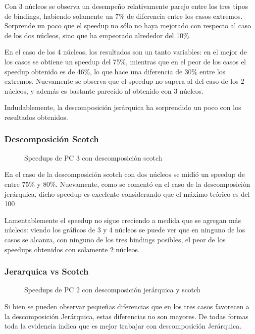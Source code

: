 \documentclass{article}
\begin{document}
Con 3 núcleos se observa un desempeño relativamente parejo entre los tres tipos de bindings, habiendo solamente un 7\% de diferencia entre los casos extremos. Sorprende un poco que el speedup no sólo no haya mejorado con respecto al caso de los dos núcleos, sino que ha empeorado alrededor del 10\%.

En el caso de los 4 núcleos, los resultados son un tanto variables: en el mejor de los casos se obtiene un speedup del 75\%, mientras que en el peor de los casos el speedup obtenido es de 46\%, lo que hace una diferencia de 30\% entre los extremos. Nuevamente se observa que el speedup no supera al del caso de los 2 núcleos, y además es bastante parecido al obtenido con 3 núcleos. 

Indudablemente, la descomposición jerárquica ha sorprendido un poco con los resultados obtenidos.

\subsubsection{Descomposición Scotch}
\begin{figure}[H]
    
    \caption{Speedups de PC 3 con descomposición scotch}
\end{figure}
En el caso de la descomposición scotch con dos núcleos se midió un speedup de entre 75\% y 80\%. Nuevamente, como se comentó en el caso de la descomposición jerárquica, dicho speedup es excelente considerando que el máximo teórico es del 100%

Lamentablemente el speedup no sigue creciendo a medida que se agregan más núcleos: viendo los gráficos de 3 y 4 núcleos se puede ver que en ninguno de los casos se alcanza, con ninguno de los tres bindings posibles, el peor de los speedups obtenidos con solamente 2 núcleos.

\subsubsection{Jerarquica vs Scotch}
\begin{figure}[H]
    
    \caption{Speedups de PC 2 con descomposición jerárquica y scotch}
\end{figure}
Si bien se pueden observar pequeñas diferencias que en los tres casos favorecen a la descomposición Jerárquica, estas diferencias no son mayores. De todas formas toda la evidencia indica que es mejor trabajar con descomposición Jerárquica.
\end{document}
